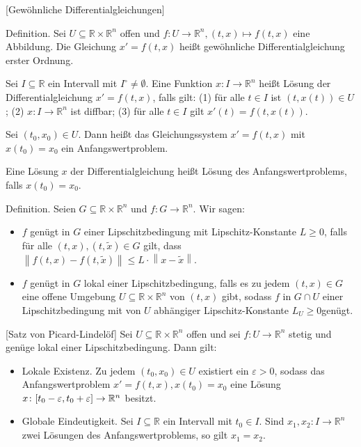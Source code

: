 \documentclass[fleqn,draft,a5paper]{article}
\providecommand{\norm}[1]{\left\lVert#1\right\rVert}
\theoremstyle{remark}
\begin{document}
[Gewöhnliche Differentialgleichungen]

Definition.  Sei \(U \subseteq \mathbb{R} \times \mathbb{R}^{n}\) offen und \(f\colon U \to \mathbb{R}^{n}, (t, x)
\mapsto f(t,x)\) eine Abbildung.  Die Gleichung \(x' = f(t, x)\) heißt
gewöhnliche Differentialgleichung erster Ordnung.

Sei \(I \subseteq \mathbb{R}\) ein Intervall mit \(I^{\circ} \ne \emptyset\).  Eine Funktion \(x \colon I \to
\mathbb{R}^{n}\) heißt Lösung der Differentialgleichung \(x' = f(t, x)\), falls
gilt: (1) für alle \(t \in I\) ist \((t, x(t)) \in U\);  (2) \(x\colon I \to \mathbb{R}^{n}\)
ist diffbar; (3) für alle \(t \in I\) gilt \(x'(t) = f(t, x(t))\).

Sei \((t_{0}, x_{0}) \in U\).  Dann heißt das Gleichungssystem \(x' = f(t,
x)\) mit \(x(t_{0}) = x_{0}\) ein Anfangswertproblem.

Eine Lösung \(x\) der Differentialgleichung heißt Lösung des
Anfangswertproblems, falls \(x(t_{0}) = x_{0}\).

Definition.  Seien \(G \subseteq \mathbb{R} \times \mathbb{R}^{n}\) und \(f\colon G \to \mathbb{R}^{n}\).  Wir sagen:
\begin{itemize}
\item \(f\) genügt in \(G\) einer Lipschitzbedingung mit
  Lipschitz-Konstante \(L \ge 0\), falls für alle \((t, x), (t, \tilde{x})
  \in G\) gilt, dass \(\norm{f(t,x) - f (t, \tilde{x})} \le L \cdot \norm{x -
    \tilde{x}}\).
\item \(f\) genügt in \(G\) lokal einer Lipschitzbedingung, falls es zu
  jedem \((t, x) \in G\) eine offene Umgebung \(U \subseteq \mathbb{R} \times \mathbb{R}^{n}\) von \((t, x)\)
  gibt, sodass \(f\) in \(G \cap U\) einer Lipschitzbedingung mit von \(U\)
  abhängiger Lipschitz-Konstante \(L_{U} \ge 0\)genügt.
\end{itemize}

[Satz von Picard-Lindelöf]  Sei \(U \subseteq \mathbb{R} \times \mathbb{R}^{n}\) offen und sei \(f\colon U \to
\mathbb{R}^{n}\) stetig und genüge lokal einer Lipschitzbedingung.  Dann gilt:
\begin{itemize}
\item Lokale Existenz.  Zu jedem \((t_{0}, x_{0}) \in U\) existiert ein
  \(\varepsilon> 0\), sodass das Anfangswertproblem \(x' = f(t,x), x(t_{0}) =
  x_{0}\) eine Lösung \(x\colon \interval{t_{0} - \varepsilon}{t_{0} + \varepsilon} \to \mathbb{R}^{n}\)
  besitzt.
\item Globale Eindeutigkeit.  Sei \(I \subseteq \mathbb{R}\) ein Intervall mit \(t_{0} \in
  I\).  Sind \(x_{1}, x_{2} \colon I \to \mathbb{R}^{n}\) zwei Lösungen des
  Anfangswertproblems, so gilt \(x_{1} = x_{2}\).
\end{itemize}
\end{document}
